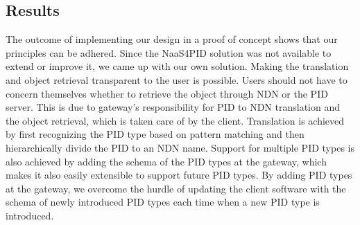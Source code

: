 \subsection{Results}\label{results-pid}
The outcome of implementing our design in a proof of concept shows that our principles can be adhered. Since the NaaS4PID solution was not available to extend or improve it, we came up with our own solution. Making the translation and object retrieval transparent to the user is possible. Users should not have to concern themselves whether to retrieve the object through NDN or the PID server. This is due to gateway's responsibility for PID to NDN translation and the object retrieval, which is taken care of by the client. 
Translation is achieved by first recognizing the PID type based on pattern matching and then hierarchically divide the PID to an NDN name. Support for multiple PID types is also achieved by adding the schema of the PID types at the gateway, which makes it also easily extensible to support future PID types. By adding PID types at the gateway, we overcome the hurdle of updating the client software with the schema of newly introduced PID types each time when a new PID type is introduced.






